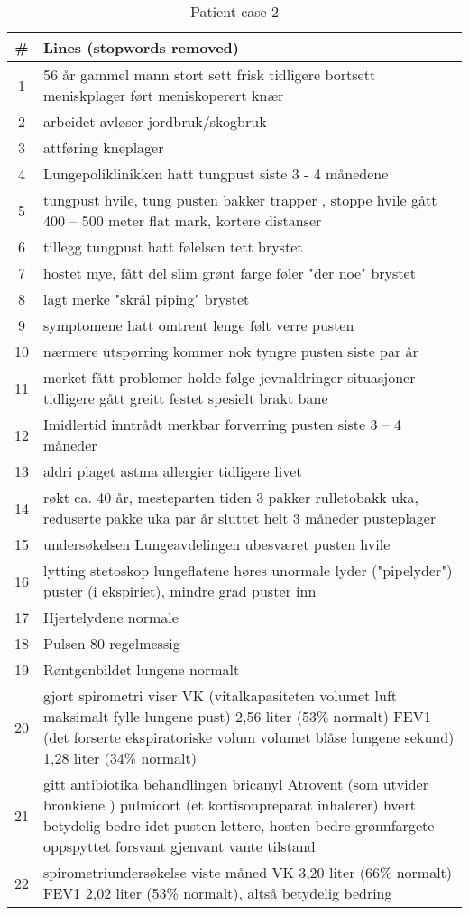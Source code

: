 \begin{table}[htbp] \footnotesize \center
\caption[]{Patient case 2\label{tab:case2}}
\begin{tabularx}{\textwidth}{c X}
    \toprule
    \# & Lines (stopwords removed) \\
    \midrule
    1 & 56 år gammel mann stort sett frisk tidligere bortsett meniskplager ført meniskoperert knær \\
    2 & arbeidet avløser jordbruk/skogbruk \\
    3 & attføring kneplager \\
    4 & Lungepoliklinikken hatt tungpust siste 3 - 4 månedene \\
    5 & tungpust hvile, tung pusten bakker trapper , stoppe hvile gått 400 -- 500 meter flat mark, kortere distanser \\
    6 & tillegg tungpust hatt følelsen tett brystet \\
    7 & hostet mye, fått del slim grønt farge føler "der noe" brystet \\
    8 & lagt merke "skrål piping" brystet \\
    9 & symptomene hatt omtrent lenge følt verre pusten \\
    10 & nærmere utspørring kommer nok tyngre pusten siste par år \\
    11 & merket fått problemer holde følge jevnaldringer situasjoner tidligere gått greitt festet spesielt brakt bane \\
    12 & Imidlertid inntrådt merkbar forverring pusten siste 3 -- 4 måneder \\
    13 & aldri plaget astma allergier tidligere livet \\
    14 & røkt ca. 40 år, mesteparten tiden 3 pakker rulletobakk uka, reduserte pakke uka par år sluttet helt 3 måneder pusteplager \\
    15 & undersøkelsen Lungeavdelingen ubesværet pusten hvile \\
    16 & lytting stetoskop lungeflatene høres unormale lyder ("pipelyder") puster (i ekspiriet), mindre grad puster inn \\
    17 & Hjertelydene normale \\
    18 & Pulsen 80 regelmessig \\
    19 & Røntgenbildet lungene normalt \\
    20 & gjort spirometri viser VK (vitalkapasiteten volumet luft maksimalt fylle lungene pust) 2,56 liter (53\% normalt) FEV1 (det forserte ekspiratoriske volum volumet blåse lungene sekund) 1,28 liter (34\% normalt) \\
    21 & gitt antibiotika behandlingen bricanyl Atrovent (som utvider bronkiene ) pulmicort (et kortisonpreparat inhalerer) hvert betydelig bedre idet pusten lettere, hosten bedre grønnfargete oppspyttet forsvant gjenvant vante tilstand \\
    22 & spirometriundersøkelse viste måned VK 3,20 liter (66\% normalt) FEV1 2,02 liter (53\% normalt), altså betydelig bedring \\
    \bottomrule
\end{tabularx}
\end{table}


